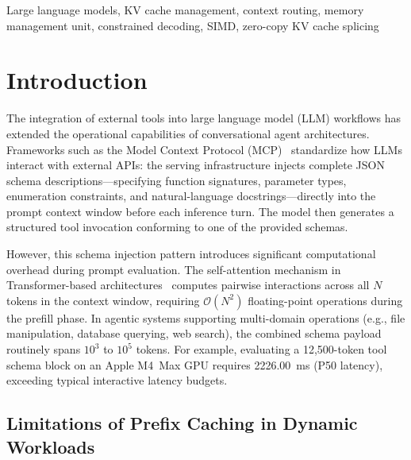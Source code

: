 \documentclass[conference,10pt]{IEEEtran}
\begin{document}
\begin{IEEEkeywords}
Large language models, KV cache management, context routing, memory management
unit, constrained decoding, SIMD, zero-copy KV cache splicing
\end{IEEEkeywords}

\section{Introduction}
\label{sec:introduction}

The integration of external tools into large language model (LLM) workflows has
extended the operational capabilities of conversational agent architectures.
Frameworks such as the Model Context Protocol (MCP)~\cite{anthropic2024mcp}
standardize how LLMs interact with external APIs: the serving infrastructure
injects complete JSON schema descriptions---specifying function signatures,
parameter types, enumeration constraints, and natural-language
docstrings---directly into the prompt context window before each inference
turn. The model then generates a structured tool invocation conforming to one
of the provided schemas.

However, this schema injection pattern introduces significant computational
overhead during prompt evaluation. The self-attention mechanism in
Transformer-based architectures~\cite{vaswani2017attention} computes pairwise
interactions across all $N$ tokens in the context window, requiring
$\mathcal{O}(N^{2})$ floating-point operations during the prefill phase. In agentic systems supporting multi-domain operations (e.g., file
manipulation, database querying, web search), the combined schema payload
routinely spans $10^{3}$ to $10^{5}$ tokens. For example, evaluating a
12,500-token tool schema block on an Apple M4~Max GPU requires
\SI{2226.00}{\milli\second} (P50 latency), exceeding typical interactive latency
budgets.

\subsection{Limitations of Prefix Caching in Dynamic Workloads}
\label{subsec:naive-caching}
\end{document}
